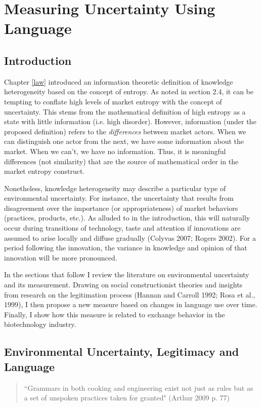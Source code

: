 \chapter{Measuring Uncertainty Using Language\label{lang}}

\section{Introduction}
Chapter \ref{law} introduced an information theoretic definition of knowledge heterogeneity based on the concept of entropy. As noted in section 2.4, it can be tempting to conflate high levels of market entropy with the concept of uncertainty. This stems from the mathematical definition of high entropy as a state with little information (i.e. high disorder). However, information (under the proposed definition) refers to the \emph{differences} between market actors. When we can distinguish one actor from the next, we have some information about the market. When we can't, we have no information. Thus, it is meaningful differences (not similarity) that are the source of mathematical order in the market entropy construct. 

Nonetheless, knowledge heterogeneity may describe a particular type of environmental uncertainty. For instance, the uncertainty that results from disagreement over the importance (or appropriateness) of market behaviors (practices, products, etc.). As alluded to in the introduction, this will naturally occur during transitions of technology, taste and attention if innovations are assumed to arise locally and diffuse gradually (Colyvas 2007; Rogers 2002). For a period following the innovation, the variance in knowledge and opinion of that innovation will be more pronounced.

In the sections that follow I review the literature on environmental uncertainty and its measurement. Drawing on social constructionist theories and insights from research on the legitimation process (Hannan and Carroll 1992; Rosa et al., 1999), I then propose a new measure based on changes in language use over time. Finally, I show how this measure is related to exchange behavior in the biotechnology industry.

\section{Environmental Uncertainty, Legitimacy and Language}
\begin{small}
\begin{quote}
``Grammars in both cooking and engineering exist not just as rules but as a set of unspoken practices taken for granted" (Arthur 2009 p. 77)
\end{quote}
\end{small}

